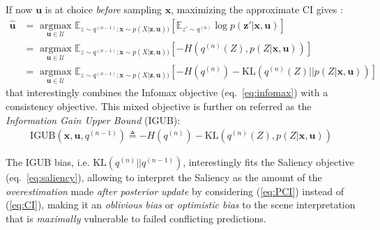 \documentclass[12pt,twoside,openright]{article}
\begin{document}
{\color{Purple}If now $\boldsymbol{u}$ is at choice \emph{before} sampling  $\boldsymbol{x}$, maximizing the approximate CI} gives :
\begin{align}
\hat{\boldsymbol{u}} 
&= \underset{\boldsymbol{u} \in \mathcal{U}}{\text{ argmax }} \mathbb{E}_{z\sim q^{(n-1)}; \boldsymbol{x}\sim p(X|\boldsymbol{z},\boldsymbol{u}))} 
\left[\mathbb{E}_{z'\sim q^{(n)} }\log p(\boldsymbol{z}'|\boldsymbol{x}, \boldsymbol{u})\right]\nonumber\\
&= \underset{\boldsymbol{u} \in \mathcal{U}}{\text{ argmax }} \mathbb{E}_{z\sim q^{(n-1)}; \boldsymbol{x}\sim p(X|\boldsymbol{z},\boldsymbol{u}))} \left[-H(q^{(n)}(Z), p(Z|\boldsymbol{x}, \boldsymbol{u}))\right]\\
&= \underset{\boldsymbol{u} \in \mathcal{U}}{\text{ argmax }} \mathbb{E}_{z\sim q^{(n-1)}; \boldsymbol{x}\sim p(X|\boldsymbol{z},\boldsymbol{u}))} \left[-H(q^{(n)}) - \text{KL}(q^{(n)}(Z)|| p(Z|\boldsymbol{x}, \boldsymbol{u}))\right]\label{eq:PC-pred}
\end{align}
that {\color{Purple} interestingly} combines the Infomax objective (eq.~\ref{eq:infomax}) with a consistency objective. This mixed objective is further on referred as the \emph{Information Gain Upper Bound} (IGUB):
\begin{align}\text{IGUB}(\boldsymbol{x}, \boldsymbol{u}, q^{(n-1)})\triangleq -H(q^{(n)}) - \text{KL}(q^{(n)}(Z), p(Z|\boldsymbol{x}, \boldsymbol{u}))\label{eq:PC}
\end{align}



{\color{Purple}The IGUB bias, i.e. $\text{KL} (q^{(n)}||q^{(n-1)})$, interestingly} fits the Saliency objective (eq.~\ref{eq:saliency}), allowing to interpret the Saliency as the amount of the \emph{overestimation} made \emph{after posterior update} by considering (\ref{eq:PCI}) instead of (\ref{eq:CI}), making it an \emph{oblivious bias} or \emph{optimistic bias} to the scene interpretation that is \emph{maximally} vulnerable to failed conflicting predictions.
\end{document}

